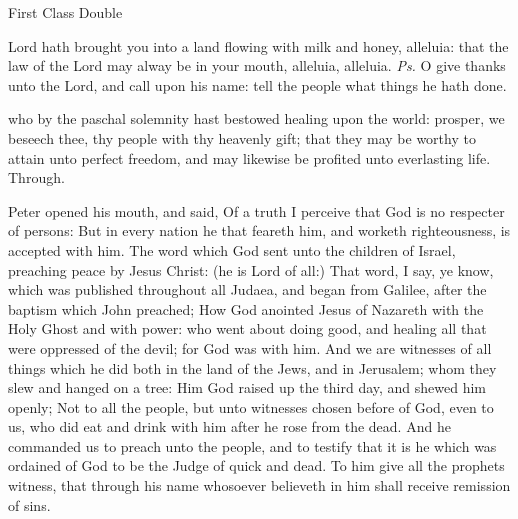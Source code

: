 \begin{inhead}
    {First Class Double}
\end{inhead}
\par\noindent
{}


\introit
{} Lord hath brought you into a land flowing with milk and honey, alleluia: that the law of the Lord may alway be in your mouth, alleluia, alleluia. \textit{Ps.} O give thanks unto the Lord, and call upon his name: tell the people what things he hath done.

\collect
 who by the paschal solemnity hast bestowed healing upon the world: prosper, we beseech thee, thy people with thy heavenly gift; that they may be worthy to attain unto perfect freedom, and may likewise be profited unto everlasting life. Through.

 Peter opened his mouth, and said, Of a truth I perceive that God is no respecter of persons: But in every nation he that feareth him, and worketh righteousness, is accepted with him. The word which God sent unto the children of Israel, preaching peace by Jesus Christ: (he is Lord of all:) That word, I say, ye know, which was published throughout all Judaea, and began from Galilee, after the baptism which John preached; How God anointed Jesus of Nazareth with the Holy Ghost and with power: who went about doing good, and healing all that were oppressed of the devil; for God was with him. And we are witnesses of all things which he did both in the land of the Jews, and in Jerusalem; whom they slew and hanged on a tree: Him God raised up the third day, and shewed him openly; Not to all the people, but unto witnesses chosen before of God, even to us, who did eat and drink with him after he rose from the dead. And he commanded us to preach unto the people, and to testify that it is he which was ordained of God to be the Judge of quick and dead. To him give all the prophets witness, that through his name whosoever believeth in him shall receive remission of sins.

